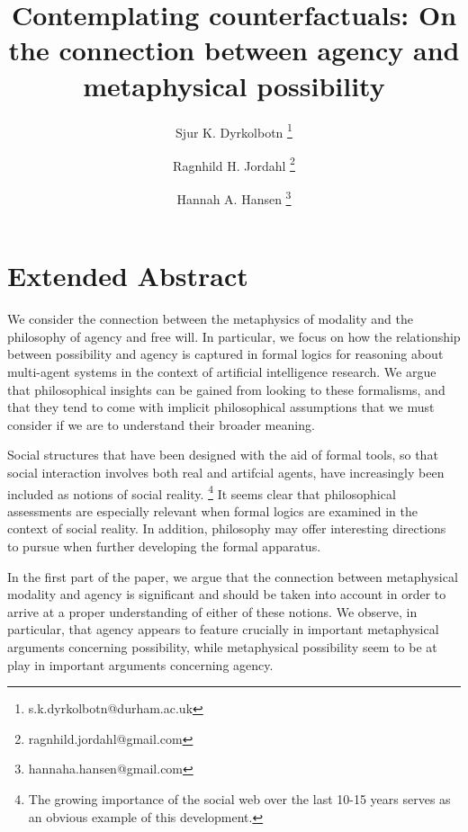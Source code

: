 \documentclass{article}
\begin{document}
\title{Contemplating counterfactuals: On the connection between agency and metaphysical possibility}
\author[1]{Sjur K. Dyrkolbotn \thanks{s.k.dyrkolbotn@durham.ac.uk}}
\author[2]{Ragnhild H. Jordahl \thanks{ragnhild.jordahl@gmail.com}}
\author[3]{Hannah A. Hansen \thanks{hannaha.hansen@gmail.com}}

\date{}
\maketitle

\section*{Extended Abstract}

We consider the connection between the metaphysics of modality and the philosophy of agency and free will.
In particular, we focus on how the relationship between possibility and agency is captured in formal logics for  reasoning about multi-agent systems in the context of artificial intelligence research. We argue that philosophical insights can be gained from looking to these formalisms, and that they tend to come with implicit philosophical assumptions that we must consider if we are to understand their broader meaning.

Social structures that have been designed with the aid of formal tools, so that social interaction involves both real and artifcial agents, have increasingly been included as notions of social reality. \footnote{The growing importance of the social web over the last 10-15 years serves as an obvious example of this development.} It seems clear that philosophical assessments are especially relevant when formal logics are examined in the context of social reality. In addition, philosophy may offer interesting directions to pursue when further developing the formal apparatus.

In the first part of the paper, we argue that the connection between metaphysical modality and agency is significant and should be taken into account in order to arrive at a proper understanding of either of these notions. We observe, in particular, that agency appears to feature crucially in important metaphysical arguments concerning possibility, while metaphysical possibility seem to be at play in important arguments concerning agency. 
\end{document}

